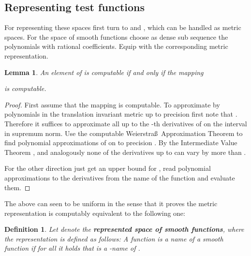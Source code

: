 \documentclass{eptcs-modified}
\newtheorem{definition}[theorem]{Definition}
\newtheorem{lemma}[theorem]{Lemma}
\newcommand{\demph}{\textbf}
\begin{document}
		\subsection{Representing test functions}
			For representing these spaces first turn to  and , which can be handled as metric spaces.
			For the space  of smooth functions choose as dense sub sequence the polynomials with rational coefficients.
			Equip  with the corresponding metric representation.
			\begin{lemma}\label{resu:evaluation of the derivatives}
				An element of  is computable if and only if the mapping
				
				is computable.
			\end{lemma}
			\begin{proof}
				First assume that the mapping is computable.
				To approximate  by polynomials in the translation invariant metric up to precision  first note that .
				Therefore it suffices to approximate all up to the -th derivatives of  on the interval  in supremum norm.
				Use the computable Weierstra\ss\ Approximation Theorem to find polynomial approximations of  on  to precision .
				By the Intermediate Value Theorem , and analogously none of the derivatives up to  can vary by more than .

				For the other direction just get an upper bound  for , read polynomial approximations to the derivatives from the name of the function  and evaluate them.
			\end{proof}
			The above can seen to be uniform in the sense that it proves the metric representation is computably equivalent to the following one:
			\begin{definition}\label{def:smooth functions reprsentation}
				Let  denote the \demph{represented space of smooth functions}, where the representation is defined as follows: A function  is a name of a smooth function  if for all  it holds that  is a -name of .
			\end{definition}
\end{document}
